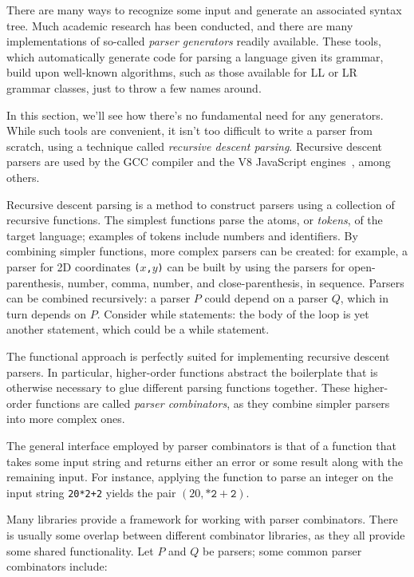 \documentclass[UdineBachThesis,american,11pt]{PhdThesis}
\begin{document}
  There are many ways to recognize some input and generate an associated syntax
  tree. Much academic research has been conducted, and there are many
  implementations of so-called \emph{parser generators} readily available. These
  tools, which automatically generate code for parsing a language given its
  grammar, build upon well-known algorithms, such as those available for LL or
  LR~\cite{lr} grammar classes, just to throw a few names around.

  In this section, we'll see how there's no fundamental need for any generators.
  While such tools are convenient, it isn't too difficult to write a parser from
  scratch, using a technique called \emph{recursive descent parsing}. Recursive
  descent parsers are used by the GCC compiler and the V8 JavaScript
  engines~\cite{recursive-descent-parsing}, among others.

  Recursive descent parsing is a method to construct parsers using a collection
  of recursive functions. The simplest functions parse the atoms, or
  \emph{tokens}, of the target language; examples of tokens include numbers and
  identifiers. By combining simpler functions, more complex parsers can be
  created: for example, a parser for 2D coordinates \mbox{\texttt{($x$,$y$)}}
  can be built by using the parsers for open-parenthesis, number, comma, number,
  and close-parenthesis, in sequence. Parsers can be combined recursively: a
  parser $P$ could depend on a parser $Q$, which in turn depends on $P$\@.
  Consider while statements: the body of the loop is yet another statement,
  which could be a while statement.

  The functional approach is perfectly suited for implementing recursive descent
  parsers. In particular, higher-order functions abstract the boilerplate that
  is otherwise necessary to glue different parsing functions together. These
  higher-order functions are called \emph{parser combinators}, as they combine
  simpler parsers into more complex ones.

  The general interface employed by parser combinators is that of a function
  that takes some input string and returns either an error or some result along
  with the remaining input. For instance, applying the function to parse an
  integer on the input string \mbox{\texttt{20*2+2}} yields the pair
  \mbox{$\left(20, \mathtt{*2+2}\right)$}.

  Many libraries provide a framework for working with parser combinators. There
  is usually some overlap between different combinator libraries, as they all
  provide some shared functionality. Let $P$ and $Q$ be parsers; some common
  parser combinators include:
\end{document}
